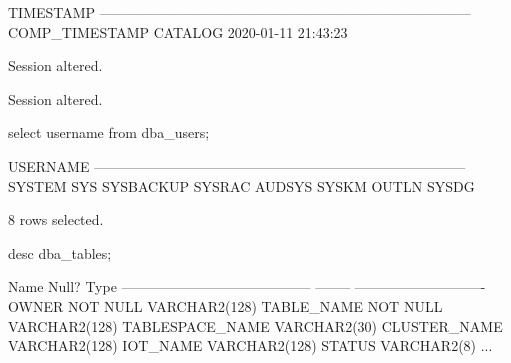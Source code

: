 \documentclass{article}
\begin{document}
\begin{enumerate}
\begin{messageshell}
TIMESTAMP
--------------------------------------------------------------------------------
COMP_TIMESTAMP CATALOG    2020-01-11 21:43:23


Session altered.


Session altered.
         \end{messageshell}
         \begin{sqlshell}
             select username from dba_users;
         \end{sqlshell}
         \begin{messageshell}
USERNAME
--------------------------------------------------------------------------------
SYSTEM
SYS
SYSBACKUP
SYSRAC
AUDSYS
SYSKM
OUTLN
SYSDG

8 rows selected.
         \end{messageshell}             
         \begin{sqlshell}
             desc dba_tables;
         \end{sqlshell}
         \begin{messageshell}
 Name                                      Null?    Type
 ----------------------------------------- -------- ----------------------------
 OWNER                                     NOT NULL VARCHAR2(128)
 TABLE_NAME                                NOT NULL VARCHAR2(128)
 TABLESPACE_NAME                                    VARCHAR2(30)
 CLUSTER_NAME                                       VARCHAR2(128)
 IOT_NAME                                           VARCHAR2(128)
 STATUS                                             VARCHAR2(8)
 ...
\end{messageshell}             
\end{enumerate}
\end{document}
